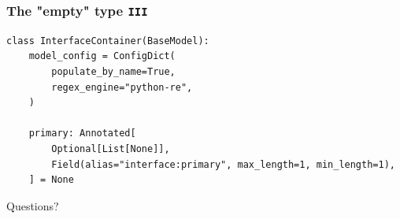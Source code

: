 \documentclass[aspectratio=169]{beamer}
\begin{document}
\begin{frame}[fragile]
  \frametitle{The "empty" type \texttt{III}}

        \begin{verbatim}
class InterfaceContainer(BaseModel):
    model_config = ConfigDict(
        populate_by_name=True,
        regex_engine="python-re",
    )

    primary: Annotated[
        Optional[List[None]],
        Field(alias="interface:primary", max_length=1, min_length=1),
    ] = None
\end{verbatim}

\end{frame}

{
\begin{frame}[plain,c]
  \begin{center}
    \Huge \color[rgb]{1,1,1}Questions?
  \end{center}
\end{frame}
}
\end{document}
